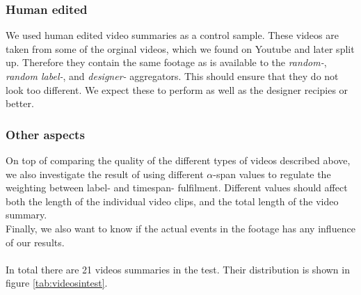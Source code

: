 \subsubsection{Human edited}
%
We used human edited video summaries as a control sample. These videos are taken from some of the orginal videos, which we found on Youtube and later split up. Therefore they contain the same footage as is available to the \textit{random-}, \textit{random label-}, and \textit{designer-} aggregators. This should ensure that they do not look too different. We expect these to perform as well as the designer recipies or better.
%
\subsubsection{Other aspects}
%
On top of comparing the quality of the different types of videos described above, we also investigate the result of using different $\alpha$-span values to regulate the weighting between label- and timespan- fulfilment. Different values should affect both the length of the individual video clips, and the total length of the video summary.\\
Finally, we also want to know if the actual events in the footage has any influence of our results.\\\\
%
In total there are 21 videos summaries in the test. Their distribution is shown in figure \ref{tab:videosintest}.
%
